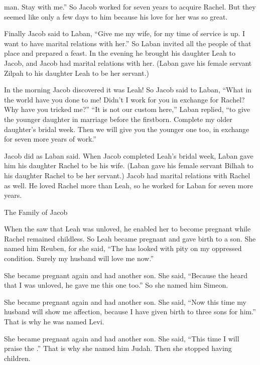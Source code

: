 {man.
Stay
with me.”
So Jacob
worked
for seven
years
to acquire Rachel.
But they seemed
like only a few
days
to him because his love for her was so great.
\par }{\PP {}Finally Jacob
said
to
Laban,
“Give
me my wife,
for
my time
of service is up.
I want to have marital relations
with her.”
So Laban
invited
all
the people
of that place
and prepared
a feast.
In the evening
he brought
his daughter
Leah
to Jacob, and Jacob had marital relations
with her.
(Laban
gave
his female servant
Zilpah
to his daughter
Leah
to be her servant.)
\par }{\PP {}In the morning
Jacob discovered
it was
Leah! So Jacob said
to
Laban,
“What
in the world
have you done
to me! Didn’t
I work for you in exchange for Rachel? Why
have you tricked me?”
“It is not
our custom
here,”
Laban
replied,
“to give
the younger
daughter in marriage before
the firstborn.
Complete my older daughter’s
bridal
week.
Then we will give
you the younger one too,
in exchange
for seven
more
years
of work.”
\par }{\PP {}Jacob did
as Laban said. When
Jacob
completed
Leah’s
bridal week,
Laban gave
him his daughter
Rachel
to be his wife.
(Laban
gave
his female servant
Bilhah
to his daughter
Rachel
to be her servant.)
Jacob had marital relations
with
Rachel
as well.
He loved
Rachel
more than Leah,
so he worked
for
Laban for seven
more
years.
\par }{\SH The Family of Jacob
\par }{\PP {}When the
{}
saw
that
Leah
was unloved,
he enabled
her to become pregnant
while Rachel
remained childless.
So Leah
became pregnant
and gave birth
to a son.
She
named
him Reuben,
for
she said,
“The
{}
has looked
with pity on my oppressed condition.
Surely
my husband
will love
me now.”
\par }{\PP {}She became pregnant
again
and had
another son.
She said,
“Because
the {}
heard
that
I was unloved, he gave
me this
one too.”
So she
named
him Simeon.
\par }{\PP {}She became pregnant
again
and had
another son.
She said,
“Now
this time
my husband
will show me affection,
because
I have given birth
to three
sons
for
him.” That is why
he was named
Levi.
\par }{\PP {}She became pregnant
again
and had
another son.
She said,
“This time
I will praise
the {}.” That is why
she
named
him Judah.
Then she stopped
having children.

}
